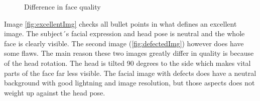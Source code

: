 \begin{figure}[h]
\centering
    \caption{Difference in face quality}
\end{figure}

Image \ref{fig:excellentImg} checks all bullet points in what defines an excellent image. The subject´s facial expression and head pose is neutral and the whole face is clearly visible. The second image (\ref{fig:defectedImg}) however does have some flaws. The main reason these two images greatly differ in quality is because of the head rotation. The head is tilted 90 degrees to the side which makes vital parts of the face far less visible. The facial image with defects does have a neutral background with good lightning and image resolution, but those aspects does not weight up against the head pose.
\newpage

